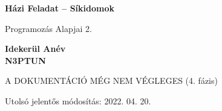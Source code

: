 
\begin{titlepage}
    \begin{center}
        \vspace*{1cm}
            
        \Huge
        \textbf{Házi Feladat – Síkidomok}
            
        \vspace{0.5cm}
        \LARGE
        Programozás Alapjai 2.
            
        \vspace{2.5cm}
            
        \textbf{Idekerül Anév}\\
        \textbf{N3PTUN}
            
        \vfill
            
        A DOKUMENTÁCIÓ MÉG NEM VÉGLEGES (4. fázis)
            
        \vspace{0.8cm}
            
            
        \Large
        Utolsó jelentős módosítás: 2022. 04. 20.
        \vspace*{1cm}
            
    \end{center}
\end{titlepage}
